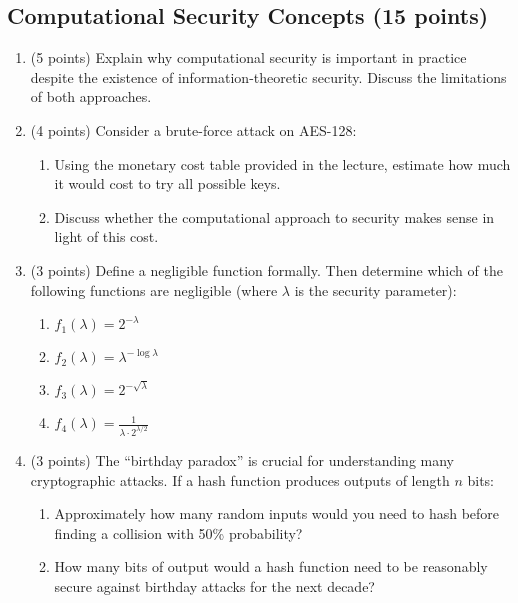 \documentclass[10pt,a4paper,american]{exam}
\begin{document}
\subsection{Computational Security Concepts (15 points)}

\begin{enumerate}
	\item (5 points) Explain why computational security is important in practice despite the existence of information-theoretic security. Discuss the limitations of both approaches.

	\item (4 points) Consider a brute-force attack on AES-128:
	      \begin{enumerate}
		      \item Using the monetary cost table provided in the lecture, estimate how much it would cost to try all possible keys.
		      \item Discuss whether the computational approach to security makes sense in light of this cost.
	      \end{enumerate}

	\item (3 points) Define a negligible function formally. Then determine which of the following functions are negligible (where $\lambda$ is the security parameter):
	      \begin{enumerate}
		      \item $f_1(\lambda) = 2^{-\lambda}$
		      \item $f_2(\lambda) = \lambda^{-\log \lambda}$
		      \item $f_3(\lambda) = 2^{-\sqrt{\lambda}}$
		      \item $f_4(\lambda) = \frac{1}{\lambda \cdot 2^{\lambda/2}}$
	      \end{enumerate}

	\item (3 points) The ``birthday paradox'' is crucial for understanding many cryptographic attacks. If a hash function produces outputs of length $n$ bits:
	      \begin{enumerate}
		      \item Approximately how many random inputs would you need to hash before finding a collision with 50\% probability?
		      \item How many bits of output would a hash function need to be reasonably secure against birthday attacks for the next decade?
	      \end{enumerate}
\end{enumerate}
\end{document}
